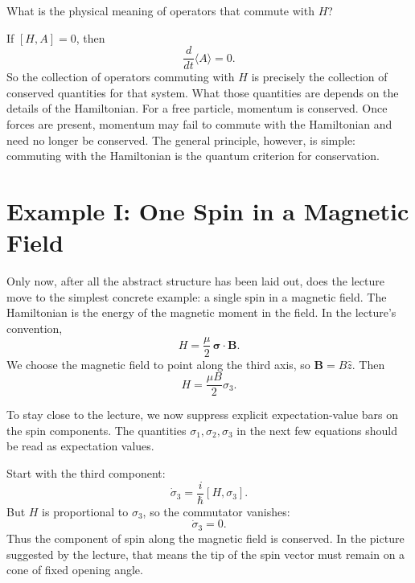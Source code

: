 What is the physical meaning of operators that commute with \(H\)?

If \([H,A]=0\), then
\begin{equation}
\frac{d}{dt}\langle A\rangle = 0.
\end{equation}
So the collection of operators commuting with \(H\) is precisely the collection of conserved quantities for that system. What those quantities are depends on the details of the Hamiltonian. For a free particle, momentum is conserved. Once forces are present, momentum may fail to commute with the Hamiltonian and need no longer be conserved. The general principle, however, is simple: commuting with the Hamiltonian is the quantum criterion for conservation.

\section{Example I: One Spin in a Magnetic Field}

Only now, after all the abstract structure has been laid out, does the lecture move to the simplest concrete example: a single spin in a magnetic field. The Hamiltonian is the energy of the magnetic moment in the field. In the lecture's convention,
\begin{equation}
H=\frac{\mu}{2}\,\boldsymbol{\sigma}\cdot \mathbf{B}.
\end{equation}
We choose the magnetic field to point along the third axis, so \(\mathbf{B}=B\hat z\). Then
\begin{equation}
H=\frac{\mu B}{2}\sigma_3.
\end{equation}

To stay close to the lecture, we now suppress explicit expectation-value bars on the spin components. The quantities \(\sigma_1,\sigma_2,\sigma_3\) in the next few equations should be read as expectation values.

Start with the third component:
\begin{equation}
\dot\sigma_3=\frac{i}{\hbar}[H,\sigma_3].
\end{equation}
But \(H\) is proportional to \(\sigma_3\), so the commutator vanishes:
\begin{equation}
\dot\sigma_3=0.
\end{equation}
Thus the component of spin along the magnetic field is conserved. In the picture suggested by the lecture, that means the tip of the spin vector must remain on a cone of fixed opening angle.

